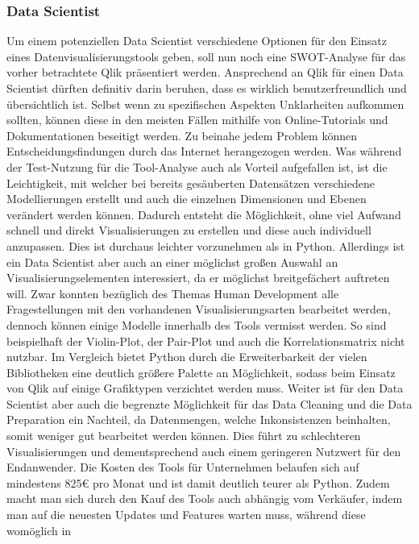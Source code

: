 \documentclass[12pt]{article}
\begin{document}
	\subsubsection{Data Scientist}
	
	Um einem potenziellen Data Scientist verschiedene Optionen für den Einsatz eines
	Datenvisualisierungstools geben, soll nun noch eine SWOT-Analyse für das vorher
	betrachtete Qlik präsentiert werden.
	Ansprechend an Qlik für einen Data Scientist dürften definitiv darin beruhen,
	dass es wirklich benutzerfreundlich und übersichtlich ist. Selbst wenn zu spezifischen
	Aspekten Unklarheiten aufkommen sollten, können diese in den meisten Fällen mithilfe
	von Online-Tutorials und Dokumentationen beseitigt werden. Zu beinahe jedem Problem
	können Entscheidungsfindungen durch das Internet herangezogen werden.
	Was während der Test-Nutzung für die Tool-Analyse auch als Vorteil aufgefallen ist, ist
	die Leichtigkeit, mit welcher bei bereits gesäuberten Datensätzen verschiedene
	Modellierungen erstellt und auch die einzelnen Dimensionen und Ebenen verändert
	werden können.
	Dadurch entsteht die Möglichkeit, ohne viel Aufwand schnell und direkt Visualisierungen
	zu erstellen und diese auch individuell anzupassen. Dies ist durchaus leichter
	vorzunehmen als in Python.
	Allerdings ist ein Data Scientist aber auch an einer möglichst großen Auswahl an
	Visualisierungselementen interessiert, da er möglichst breitgefächert auftreten will.
	Zwar konnten bezüglich des Themas Human Development alle Fragestellungen mit den
	vorhandenen Visualisierungsarten bearbeitet werden, dennoch können einige Modelle
	innerhalb des Tools vermisst werden. So sind beispielhaft der Violin-Plot, der Pair-Plot
	und auch die Korrelationsmatrix nicht nutzbar.
	Im Vergleich bietet Python durch die Erweiterbarkeit der vielen Bibliotheken eine
	deutlich größere Palette an Möglichkeit, sodass beim Einsatz von Qlik auf einige
	Grafiktypen verzichtet werden muss.
	Weiter ist für den Data Scientist aber auch die begrenzte Möglichkeit für das Data
	Cleaning und die Data Preparation ein Nachteil, da Datenmengen, welche
	Inkonsistenzen beinhalten, somit weniger gut bearbeitet werden können. Dies führt
	zu schlechteren Visualisierungen und dementsprechend auch einem
	geringeren Nutzwert für den Endanwender.
	Die Kosten des Tools für Unternehmen belaufen sich auf mindestens 825€ pro Monat und ist damit deutlich teurer als Python.
	Zudem macht man sich durch den Kauf des Tools auch abhängig vom Verkäufer, indem
	man auf die neuesten Updates und Features warten muss, während diese womöglich in
\end{document}
